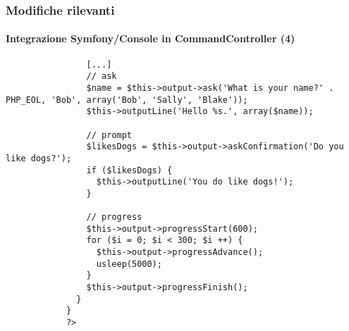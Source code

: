 
\begin{frame}[fragile]
	\frametitle{Modifiche rilevanti}
	\framesubtitle{Integrazione Symfony/Console in CommandController (4)}

	\lstset{basicstyle=\tiny\ttfamily}

		\begin{lstlisting}
			    [...]
			    // ask
			    $name = $this->output->ask('What is your name?' . PHP_EOL, 'Bob', array('Bob', 'Sally', 'Blake'));
			    $this->outputLine('Hello %s.', array($name));

			    // prompt
			    $likesDogs = $this->output->askConfirmation('Do you like dogs?');
			    if ($likesDogs) {
			      $this->outputLine('You do like dogs!');
			    }

			    // progress
			    $this->output->progressStart(600);
			    for ($i = 0; $i < 300; $i ++) {
			      $this->output->progressAdvance();
			      usleep(5000);
			    }
			    $this->output->progressFinish();
			  }
			}
			?>
		\end{lstlisting}

\end{frame}


